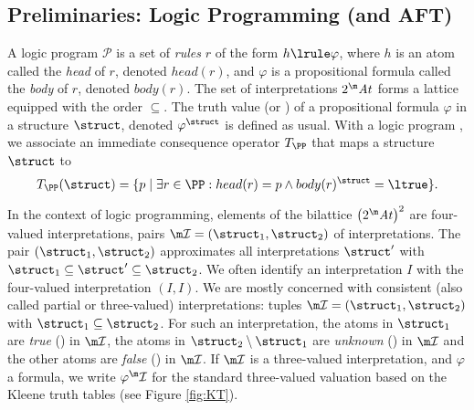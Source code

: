 \subsection{Preliminaries: Logic Programming (and AFT)}
\renewcommand\voc\atoms
A logic program $\mathcal{P}$ is a set of \emph{rules} $r$ of the form 
$h\lrule \varphi$, where
$h$ is an atom called the \emph{head} of $r$, denoted $head(r)$, and $\varphi$ is a propositional formula called  the \emph{body} of $r$, denoted $body(r)$.
The set of interpretations $2^\voc$ forms a lattice equipped with the order $\subseteq$. 
The truth value (\ltrue or \lfalse) of a propositional formula $\varphi$ in a structure $\struct$, denoted $\varphi^\struct$ is defined as usual.
With a logic program \PP, we associate an immediate consequence operator \cite{jacm/EmdenK76} $T_\PP$ that maps a structure $\struct$ to 
	\[T_\PP(\struct) = \{p\mid \exists r \in \PP: head(r)=p\land body(r)^\struct=\ltrue\}.\] 
	
	
	In the context of logic programming, elements of the bilattice $\left(2^\voc\right)^2$ are four-valued interpretations, pairs $\pstruct= (\struct_1,\struct_2)$ of interpretations.
The pair $(\struct_1,\struct_2)$ approximates all interpretations $\struct'$ with $\struct_1\subseteq \struct'\subseteq \struct_2$.
We often identify an interpretation $I$ with the four-valued interpretation $(I,I)$.
We are mostly concerned with consistent (also called partial or three-valued) interpretations: tuples $\pstruct=(\struct_1,\struct_2)$ with $\struct_1\subseteq\struct_2$. 
For such an interpretation, the atoms in $\struct_1$ are \emph{true} (\ltrue) in $\pstruct$, the atoms in $\struct_2\setminus\struct_1$ are \emph{unknown} (\lunkn) in $\pstruct$ and the other atoms are \emph{false} (\lfalse) in $\pstruct$. 
If $\pstruct$ is a three-valued interpretation, and $\varphi$ a formula, we write $\varphi^\pstruct$ for the standard three-valued valuation based on the Kleene truth tables (see Figure \ref{fig:KT}). 




